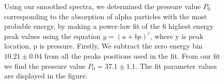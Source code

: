 \documentclass[a4paper]{article}
\begin{document}
\begin{figure}
\caption{
Using our smoothed spectra, we determined the pressure value $P_0$ corresponding to the absorption of alpha particles with the most probable energy, by making a power-law fit of the 6 highest energy peak values using the equation $y=(a+bp)^c$, where y is peak location, p is pressure\cite{feedback}. 
Firstly, We subtract the zero energy bin $10.21 \pm 0.04$ from all the peaks positions used in the fit. From our fit we find the pressure value $P_0 = 37.1 \pm 1.1$.
The fit parameter values are displayed in the figure. 
}
\end{figure}
\end{document}
